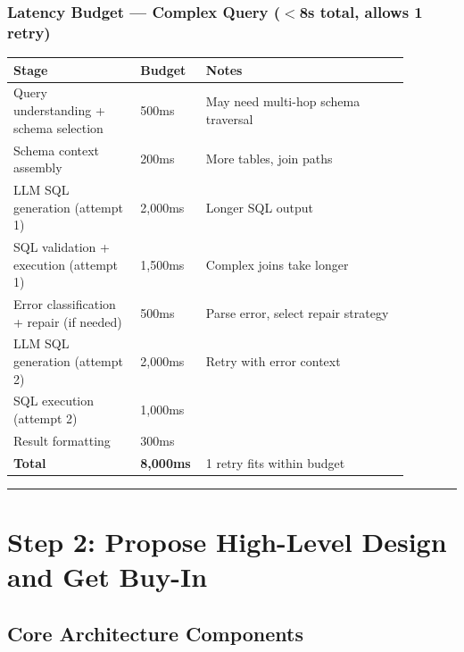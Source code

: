 \subsubsection*{Latency Budget --- Complex Query ($<$8s total, allows 1 retry)}

\begin{tabular}{|p{0.30\linewidth}|p{0.10\linewidth}|p{0.48\linewidth}|}
\hline
\textbf{Stage} & \textbf{Budget} & \textbf{Notes} \\
\hline
Query understanding + schema selection & 500ms & May need multi-hop schema traversal \\
\hline
Schema context assembly & 200ms & More tables, join paths \\
\hline
LLM SQL generation (attempt 1) & 2,000ms & Longer SQL output \\
\hline
SQL validation + execution (attempt 1) & 1,500ms & Complex joins take longer \\
\hline
Error classification + repair (if needed) & 500ms & Parse error, select repair strategy \\
\hline
LLM SQL generation (attempt 2) & 2,000ms & Retry with error context \\
\hline
SQL execution (attempt 2) & 1,000ms & \\
\hline
Result formatting & 300ms & \\
\hline
\textbf{Total} & \textbf{8,000ms} & 1 retry fits within budget \\
\hline
\end{tabular}

\bigskip\hrule\bigskip

\section*{Step 2: Propose High-Level Design and Get Buy-In}

\subsection*{Core Architecture Components}

